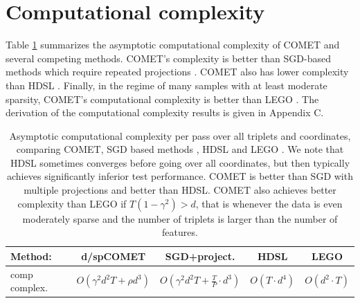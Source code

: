 \documentclass[twoside,11pt]{article}
\begin{document}
\section{Computational complexity}\vskip -5pt

Table \ref{comp-complx} summarizes the asymptotic computational complexity of COMET and several competing methods. COMET's complexity is better than SGD-based methods which require repeated projections \citep{OASIS, qian}. COMET also has lower complexity than HDSL \citep{HDSL}.  Finally, in the regime of many samples with at least moderate sparsity, COMET's computational complexity is better than LEGO \citep{lego}. The derivation of the computational complexity results is given in Appendix C.


\begin{table}[t]
\captionsetup{font=small}
\caption{Asymptotic computational complexity per pass over all triplets and coordinates, comparing COMET, SGD based methods \citep{OASIS, qian}, HDSL \citep{HDSL} and LEGO \citep{lego}. We note that HDSL sometimes converges before going over all coordinates, but then typically achieves significantly inferior test performance. COMET is better than SGD with multiple projections and better than HDSL. COMET also achieves better complexity than LEGO if $T(1-\gamma^2) > d$, that is whenever the data is even moderately sparse and the number of triplets is larger than the number of features.}
\label{comp-complx}
\vskip 0.15in
\begin{center}
\begin{small}
\begin{sc}
\begin{tabular}{lcccc}
\hline
Method: & d/spCOMET  & SGD+project.  & HDSL    & LEGO         \\ 
\hline
comp complex. & $O(\gamma^2 d^2 T +  \rho d^3)$&  $O(\gamma^2 d^2 T + \frac{T}{P} \cdot d^3)$
&   $O( T\cdot  d^4)$ &   $O(d^2 \cdot T)$  \\
\hline
\end{tabular}
\end{sc}
\end{small}
\end{center}
\vskip -0.1in
\end{table}
\end{document}
